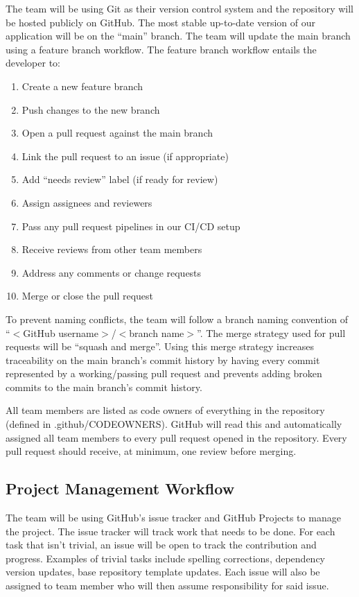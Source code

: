 \documentclass{article}
\begin{document}
The team will be using Git as their version control system and the repository will be hosted
publicly on GitHub. The most stable up-to-date version of our application will be on the ``main''
branch. The team will update the main branch using a feature branch workflow. The feature branch
workflow entails the developer to:

\begin{enumerate}
  \item Create a new feature branch
  \item Push changes to the new branch
  \item Open a pull request against the main branch
  \item Link the pull request to an issue (if appropriate)
  \item Add ``needs review'' label (if ready for review)
  \item Assign assignees and reviewers
  \item Pass any pull request pipelines in our CI/CD setup
  \item Receive reviews from other team members
  \item Address any comments or change requests
  \item Merge or close the pull request
\end{enumerate}

To prevent naming conflicts, the team will follow a branch naming convention of
``$<$GitHub username$>$/$<$branch name$>$''. The merge strategy used for pull requests will be
``squash and merge''. Using this merge strategy increases traceability on the main branch's commit
history by having every commit represented by a working/passing pull request and prevents adding
broken commits to the main branch's commit history.

All team members are listed as code owners of everything in the repository (defined in
.github/CODEOWNERS). GitHub will read this and automatically assigned all team members to every pull
request opened in the repository. Every pull request should receive, at minimum, one review before
merging.

\subsection{Project Management Workflow}

The team will be using GitHub's issue tracker and GitHub Projects to manage the project. The issue
tracker will track work that needs to be done. For each task that isn't trivial, an issue will be
open to track the contribution and progress. Examples of trivial tasks include spelling corrections,
dependency version updates, base repository template updates. Each issue will also be assigned to
team member who will then assume responsibility for said issue.
\end{document}
